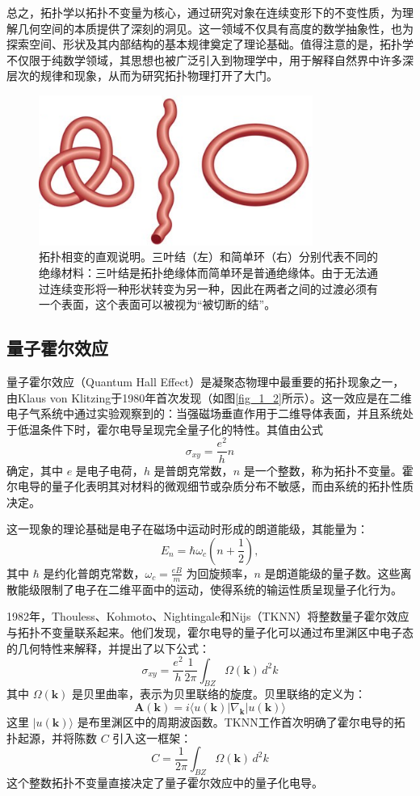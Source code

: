总之，拓扑学以拓扑不变量为核心，通过研究对象在连续变形下的不变性质，为理解几何空间的本质提供了深刻的洞见。这一领域不仅具有高度的数学抽象性，也为探索空间、形状及其内部结构的基本规律奠定了理论基础。值得注意的是，拓扑学不仅限于纯数学领域，其思想也被广泛引入到物理学中，用于解释自然界中许多深层次的规律和现象，从而为研究拓扑物理打开了大门。
\begin{figure}[h!]
    \centering
    \includegraphics[width=0.8\textwidth]{images/fig1-1.png} 
    \caption{拓扑相变的直观说明。三叶结（左）和简单环（右）分别代表不同的绝缘材料：三叶结是拓扑绝缘体而简单环是普通绝缘体。由于无法通过连续变形将一种形状转变为另一种，因此在两者之间的过渡必须有一个表面，这个表面可以被视为“被切断的结”。\cite{d1}}
    \label{fig_1_1}
\end{figure}


\subsection{量子霍尔效应}
量子霍尔效应（Quantum Hall Effect）是凝聚态物理中最重要的拓扑现象之一，由Klaus von Klitzing于1980年首次发现\cite{d2}（如图\ref{fig_1_2}所示）。这一效应是在二维电子气系统中通过实验观察到的：当强磁场垂直作用于二维导体表面，并且系统处于低温条件下时，霍尔电导呈现完全量子化的特性。其值由公式
\[
\sigma_{xy} = \frac{e^2}{h} n
\]
确定，其中 \( e \) 是电子电荷，\( h \) 是普朗克常数，\( n \) 是一个整数，称为拓扑不变量。霍尔电导的量子化表明其对材料的微观细节或杂质分布不敏感，而由系统的拓扑性质决定。

这一现象的理论基础是电子在磁场中运动时形成的朗道能级，其能量为：
\[
E_n = \hbar \omega_c \left( n + \frac{1}{2} \right),
\]
其中 \( \hbar \) 是约化普朗克常数，\( \omega_c = \frac{eB}{m} \) 为回旋频率，\( n \) 是朗道能级的量子数。这些离散能级限制了电子在二维平面中的运动，使得系统的输运性质呈现量子化行为。

1982年，Thouless、Kohmoto、Nightingale和Nijs（TKNN）将整数量子霍尔效应与拓扑不变量联系起来\cite{d3}。他们发现，霍尔电导的量子化可以通过布里渊区中电子态的几何特性来解释，并提出了以下公式：
\[
\sigma_{xy} = \frac{e^2}{h} \frac{1}{2\pi} \int_{BZ} \Omega(\mathbf{k}) \, d^2k
\]
其中 \( \Omega(\mathbf{k}) \) 是贝里曲率，表示为贝里联络的旋度。贝里联络的定义为：
\[
\mathbf{A}(\mathbf{k}) = i \langle u(\mathbf{k}) | \nabla_{\mathbf{k}} | u(\mathbf{k}) \rangle
\]
这里 \( |u(\mathbf{k})\rangle \) 是布里渊区中的周期波函数。TKNN工作首次明确了霍尔电导的拓扑起源，并将陈数 \( C \) 引入这一框架：
\[
C = \frac{1}{2\pi} \int_{BZ} \Omega(\mathbf{k}) \, d^2k
\]
这个整数拓扑不变量直接决定了量子霍尔效应中的量子化电导。

